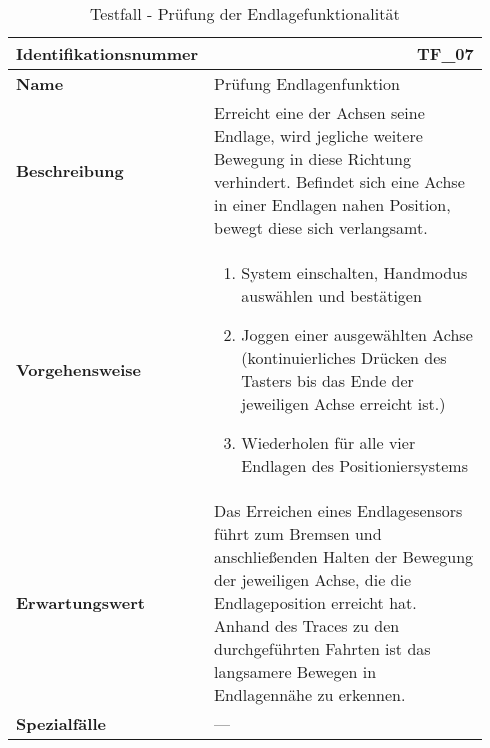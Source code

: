 \documentclass[../../../Bachelorarbeit.tex]{subfiles}
\begin{document}
\begin{table}[H]
    \centering
    \begin{tabular}{ p{0.34\linewidth}  p{0.6\linewidth} }
        \hline
        \textbf{Identifikationsnummer}  & \multicolumn{1}{r}{TF\_07} \\ \hline
        \textbf{Name}                   & Prüfung Endlagenfunktion \\
        \textbf{Beschreibung}           & Erreicht eine der Achsen seine Endlage, wird jegliche weitere Bewegung in diese Richtung verhindert. Befindet sich eine Achse in einer Endlagen nahen Position, bewegt diese sich verlangsamt. \\
        \textbf{Vorgehensweise}         &   {\begin{enumerate}[noitemsep,topsep=0pt,parsep=0pt,partopsep=0pt,leftmargin=*]
                                                \item System einschalten, Handmodus auswählen und bestätigen
                                                \item Joggen einer ausgewählten Achse (kontinuierliches Drücken des Tasters bis das Ende der jeweiligen Achse erreicht ist.)
                                                \item Wiederholen für alle vier Endlagen des Positioniersystems
                                            \end{enumerate}} \\
        \textbf{Erwartungswert}         & Das Erreichen eines Endlagesensors führt zum Bremsen und anschließenden Halten der Bewegung der jeweiligen Achse, die die Endlageposition erreicht hat. Anhand des Traces zu den durchgeführten Fahrten ist das langsamere Bewegen in Endlagennähe zu erkennen. \\
        \textbf{Spezialfälle}           & --- \\ \hline
    \end{tabular}
    \caption[\acs{tf} - Endlagenfunktion]{Testfall - Prüfung der Endlagefunktionalität}
    \label{tab:my-table66}
\end{table}
\end{document}
